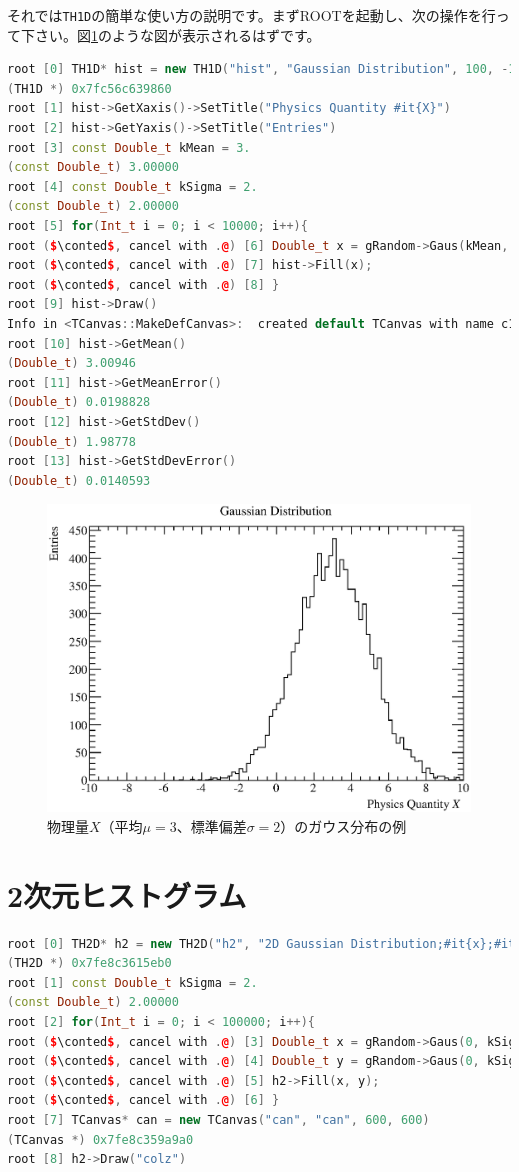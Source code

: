 それでは\texttt{TH1D}の簡単な使い方の説明です。まずROOTを起動し、次の操作を行って下さい。図\ref{fig_TH1D_eps}のような図が表示されるはずです。

\begin{lstlisting}[language=c++,mathescape]
root [0] TH1D* hist = new TH1D("hist", "Gaussian Distribution", 100, -10, 10)
(TH1D *) 0x7fc56c639860
root [1] hist->GetXaxis()->SetTitle("Physics Quantity #it{X}")
root [2] hist->GetYaxis()->SetTitle("Entries")
root [3] const Double_t kMean = 3.
(const Double_t) 3.00000
root [4] const Double_t kSigma = 2.
(const Double_t) 2.00000
root [5] for(Int_t i = 0; i < 10000; i++){
root ($\conted$, cancel with .@) [6] Double_t x = gRandom->Gaus(kMean, kSigma);
root ($\conted$, cancel with .@) [7] hist->Fill(x);
root ($\conted$, cancel with .@) [8] }
root [9] hist->Draw()
Info in <TCanvas::MakeDefCanvas>:  created default TCanvas with name c1
root [10] hist->GetMean()
(Double_t) 3.00946
root [11] hist->GetMeanError()
(Double_t) 0.0198828
root [12] hist->GetStdDev()
(Double_t) 1.98778
root [13] hist->GetStdDevError()
(Double_t) 0.0140593
\end{lstlisting}

\begin{figure}
  \centering
  \includegraphics[width=12cm,clip]{fig/TH1D.eps}
  \caption{物理量$X$（平均$\mu = 3$、標準偏差$\sigma = 2$）のガウス分布の例}
  \label{fig_TH1D_eps}
\end{figure}

\section{2次元ヒストグラム}

\begin{lstlisting}[language=c++,breaklines=true,mathescape]
root [0] TH2D* h2 = new TH2D("h2", "2D Gaussian Distribution;#it{x};#it{y};Entries", 100, -10, 10, 100, -10, 10)
(TH2D *) 0x7fe8c3615eb0
root [1] const Double_t kSigma = 2.
(const Double_t) 2.00000
root [2] for(Int_t i = 0; i < 100000; i++){
root ($\conted$, cancel with .@) [3] Double_t x = gRandom->Gaus(0, kSigma);
root ($\conted$, cancel with .@) [4] Double_t y = gRandom->Gaus(0, kSigma);
root ($\conted$, cancel with .@) [5] h2->Fill(x, y);
root ($\conted$, cancel with .@) [6] }
root [7] TCanvas* can = new TCanvas("can", "can", 600, 600)
(TCanvas *) 0x7fe8c359a9a0
root [8] h2->Draw("colz")
\end{lstlisting}

